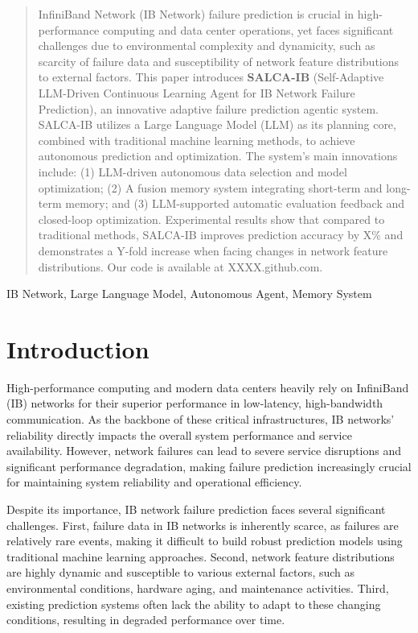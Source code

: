 \documentclass[conference]{IEEEtran}
\begin{document}
\begin{abstract}
InfiniBand Network (IB Network) failure prediction is crucial in high-performance computing and data center operations, yet faces significant challenges due to environmental complexity and dynamicity, such as scarcity of failure data and susceptibility of network feature distributions to external factors. This paper introduces \textbf{SALCA-IB} (Self-Adaptive LLM-Driven Continuous Learning Agent for IB Network Failure Prediction), an innovative adaptive failure prediction agentic system. SALCA-IB utilizes a Large Language Model (LLM) as its planning core, combined with traditional machine learning methods, to achieve autonomous prediction and optimization. The system's main innovations include: (1) LLM-driven autonomous data selection and model optimization; (2) A fusion memory system integrating short-term and long-term memory; and (3) LLM-supported automatic evaluation feedback and closed-loop optimization. Experimental results show that compared to traditional methods, SALCA-IB improves prediction accuracy by X\% and demonstrates a Y-fold increase when facing changes in network feature distributions. Our code is available at XXXX.github.com.
\end{abstract}

\begin{IEEEkeywords}
IB Network, Large Language Model, Autonomous Agent, Memory System
\end{IEEEkeywords}

\section{Introduction}
High-performance computing and modern data centers heavily rely on InfiniBand (IB) networks for their superior performance in low-latency, high-bandwidth communication. As the backbone of these critical infrastructures, IB networks' reliability directly impacts the overall system performance and service availability. However, network failures can lead to severe service disruptions and significant performance degradation, making failure prediction increasingly crucial for maintaining system reliability and operational efficiency.

Despite its importance, IB network failure prediction faces several significant challenges. First, failure data in IB networks is inherently scarce, as failures are relatively rare events, making it difficult to build robust prediction models using traditional machine learning approaches. Second, network feature distributions are highly dynamic and susceptible to various external factors, such as environmental conditions, hardware aging, and maintenance activities. Third, existing prediction systems often lack the ability to adapt to these changing conditions, resulting in degraded performance over time.
\end{document}
